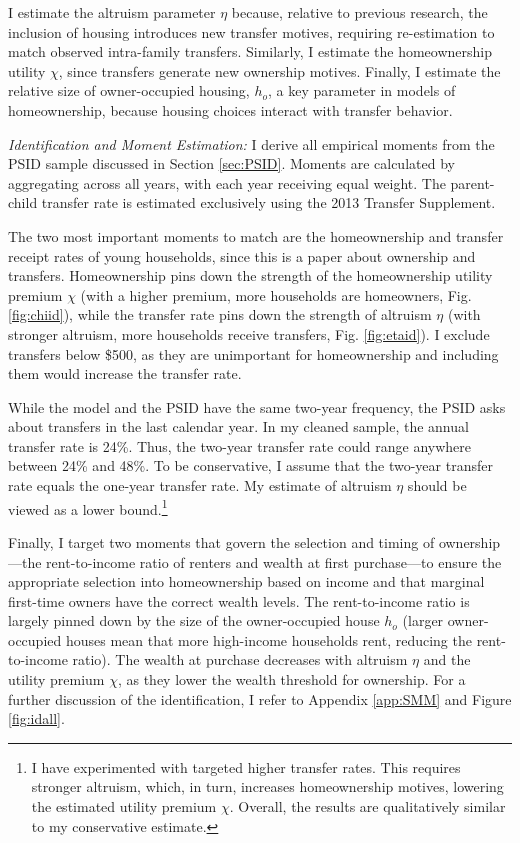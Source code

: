 \documentclass[12pt]{article}
\begin{document}
I estimate the altruism parameter $\eta$ because, relative to previous research, the inclusion of housing introduces new transfer motives, requiring re-estimation to match observed intra-family transfers. Similarly, I estimate the homeownership utility $\chi$, since transfers generate new ownership motives. Finally, I estimate the relative size of owner-occupied housing, $h_o$, a key parameter in models of homeownership, because housing choices interact with transfer behavior.

\textit{Identification and Moment Estimation:}
I derive all empirical moments from the PSID sample discussed in Section \ref{sec:PSID}. Moments are calculated by aggregating across all years, with each year receiving equal weight. The parent-child transfer rate is estimated exclusively using the 2013 Transfer Supplement.

The two most important moments to match are the homeownership and transfer receipt rates of young households, since this is a paper about ownership and transfers. Homeownership pins down the strength of the homeownership utility premium $\chi$ (with a higher premium, more households are homeowners, Fig. \ref{fig:chiid}), while the transfer rate pins down the strength of altruism $\eta$ (with stronger altruism, more households receive transfers, Fig. \ref{fig:etaid}). I exclude transfers below \$500, as they are unimportant for homeownership and including them would increase the transfer rate.

While the model and the PSID have the same two-year frequency, the PSID asks about transfers in the last calendar year. In my cleaned sample, the annual transfer rate is 24\%. Thus, the two-year transfer rate could range anywhere between 24\% and 48\%. To be conservative, I assume that the two-year transfer rate equals the one-year transfer rate. My estimate of altruism $\eta$ should be viewed as a lower bound.\footnote{I have experimented with targeted higher transfer rates. This requires stronger altruism, which, in turn, increases homeownership motives, lowering the estimated utility premium $\chi$. Overall, the results are qualitatively similar to my conservative estimate.}

Finally, I target two moments that govern the selection and timing of ownership---the rent-to-income ratio of renters and wealth at first purchase---to ensure the appropriate selection into homeownership based on income and that marginal first-time owners have the correct wealth levels. The rent-to-income ratio is largely pinned down by the size of the owner-occupied house $h_o$ (larger owner-occupied houses mean that more high-income households rent, reducing the rent-to-income ratio). The wealth at purchase decreases with altruism $\eta$ and the utility premium $\chi$, as they lower the wealth threshold for ownership. For a further discussion of the identification, I refer to Appendix \ref{app:SMM} and Figure \ref{fig:idall}.
\end{document}
